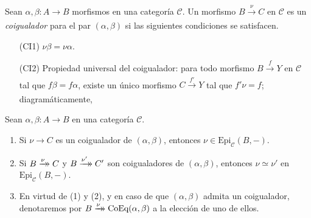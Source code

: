 \documentclass[tesis]{subfiles}
\begin{document}
    \begin{Def} \label{Def: Coigualador}
        Sean $\alpha,\beta:A\to B$ morfismos en una categoría $\mathscr{C}$. Un morfismo $B\xrightarrow[]{\nu} C$ en $\mathscr{C}$ es un \emph{coigualador} para el par $(\alpha,\beta)$ si las siguientes condiciones se satisfacen.

        \begin{itemize}
            \item[(CI1)] $\nu\beta=\nu\alpha$.

            \item[(CI2)] Propiedad universal del coigualador: para todo morfismo $B\xrightarrow[]{f} Y$ en $\mathscr{C}$ tal que $f\beta=f\alpha$, existe un único morfismo $C\xrightarrow[]{f'} Y$ tal que $f'\nu = f$; diagramáticamente,
                \begin{center}
                \end{center}
        \end{itemize}
    \end{Def}

    \begin{Obs} \label{Mendoza-1.1.4}
        Sean $\alpha,\beta:A\to B$ en una categoría $\mathscr{C}$.
        \begin{enumerate}[label=(\arabic*)]
            \item Si $\nu\to C$ es un coigualador de $(\alpha,\beta)$, entonces $\nu\in\text{Epi}_\mathscr{C}(B,-)$.

            \item Si $B\xrightarrow[]{\nu}\mathrel{\mkern-14mu}\rightarrow C$ y $B\xrightarrow[]{\nu'}\mathrel{\mkern-14mu}\rightarrow C'$ son coigualadores de $(\alpha,\beta)$, entonces $\nu\simeq\nu'$ en $\text{Epi}_\mathscr{C}(B,-)$.

            \item En virtud de (1) y (2), y en caso de que $(\alpha,\beta)$ admita un coigualador, denotaremos por $B\xrightarrow[]{\nu}\mathrel{\mkern-14mu}\rightarrow\text{CoEq}(\alpha,\beta)$ a la elección de uno de ellos.

    \end{enumerate}
\end{Obs}
\end{document}
